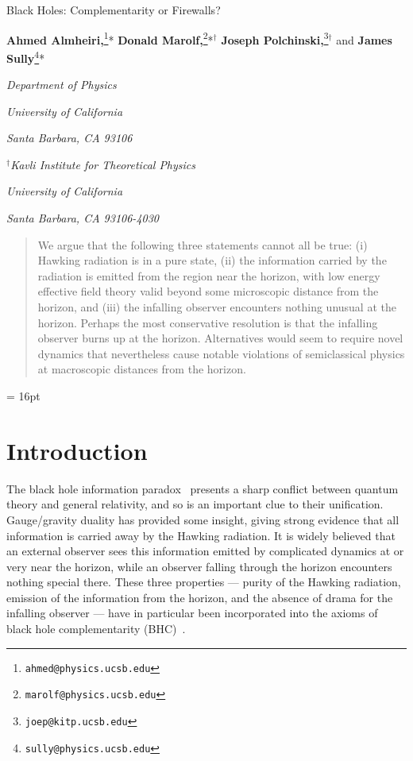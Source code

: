 \documentclass[12pt]{article}
\begin{document}



\begin{titlepage}
\bigskip
\bigskip\bigskip\bigskip
\centerline{\Large Black Holes: Complementarity or Firewalls?}
\bigskip\bigskip\bigskip
\bigskip\bigskip\bigskip

 \centerline{{\bf Ahmed Almheiri,}\footnote{\tt ahmed@physics.ucsb.edu}*
 {\bf Donald Marolf,}\footnote{\tt marolf@physics.ucsb.edu}*${}^\dagger$
 {\bf Joseph Polchinski,}\footnote{\tt joep@kitp.ucsb.edu}${}^\dagger$
 and {\bf James Sully}\footnote{\tt sully@physics.ucsb.edu}*}
\medskip
\centerline{\em *Department of Physics}
\centerline{\em University of California}
\centerline{\em Santa Barbara, CA 93106}
\medskip
\centerline{\em ${}^\dagger$Kavli Institute for Theoretical Physics}
\centerline{\em University of California}
\centerline{\em Santa Barbara, CA 93106-4030}\bigskip
\bigskip\bigskip




\begin{abstract}
We argue that the following three statements cannot all be true: (i)  Hawking radiation is in a pure state, (ii)  the information carried by the radiation is emitted from the region near the horizon, with low energy effective field theory valid beyond some microscopic distance from the horizon, and (iii)  the infalling observer encounters nothing unusual at the horizon.  Perhaps the most conservative resolution is that the infalling observer burns up at the horizon.  Alternatives would seem to require novel dynamics that nevertheless cause notable violations of semiclassical physics at macroscopic distances from the horizon.


\end{abstract}
\end{titlepage}

\baselineskip = 16pt

\tableofcontents


\setcounter{footnote}{0}

\section{Introduction}



The black hole information paradox~\cite{Hawking:1976ra} presents a sharp conflict between quantum theory and general relativity, and so is an important clue to their unification.  Gauge/gravity duality has provided some insight, giving strong evidence that all information is carried away by the Hawking radiation.  It is widely believed that an external observer sees this information emitted by complicated dynamics at or very near the horizon, while an observer falling through the horizon encounters nothing special there.  These three properties --- purity of the Hawking radiation, emission of the information from the horizon, and the absence of drama for the infalling observer --- have in particular been incorporated into the axioms of black hole complementarity (BHC)~\cite{Susskind:1993if,Stephens:1993an}.
\end{document}
